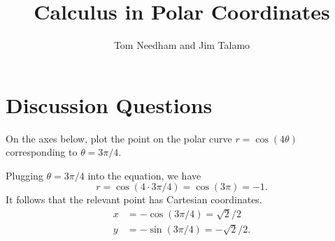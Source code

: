 \documentclass[noauthor]{ximera}
\author{Tom Needham and Jim Talamo}
\title[Collaborate:]{Calculus in Polar Coordinates}
\begin{document}
\begin{abstract}
\end{abstract}
\maketitle

\section{Discussion Questions}

\begin{problem}

On the axes below, plot the point on the polar curve $r = \cos (4 \theta)$ corresponding to $\theta = 3\pi/4$. 

\begin{image}  
\end{image} 


\begin{freeResponse}
Plugging $\theta = 3\pi/4$ into the equation, we have
$$
r = \cos (4 \cdot 3 \pi/4)  = \cos (3\pi) = -1. 
$$
It follows that the relevant point has Cartesian coordinates.
\begin{align*}
x &= -\cos(3 \pi /4) = \sqrt{2}/2 \\
y &= -\sin(3 \pi/4) = - \sqrt{2}/2.
\end{align*}
\end{freeResponse}
\end{problem}
\end{document}
